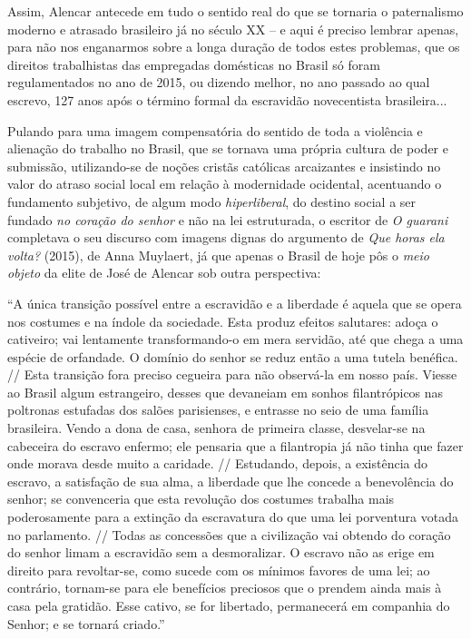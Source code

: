 Assim, Alencar antecede em tudo o sentido real do que se tornaria o
paternalismo moderno e atrasado brasileiro já no século XX -- e aqui é
preciso lembrar apenas, para não nos enganarmos sobre a longa duração de
todos estes problemas, que os direitos trabalhistas das empregadas
domésticas no Brasil só foram regulamentados no ano de 2015, ou dizendo
melhor, no ano passado ao qual escrevo, 127 anos após o término formal
da escravidão novecentista brasileira...

Pulando para uma imagem compensatória do sentido de toda a violência e
alienação do trabalho no Brasil, que se tornava uma própria cultura de
poder e submissão, utilizando-se de noções cristãs católicas arcaizantes
e insistindo no valor do atraso social local em relação à modernidade
ocidental, acentuando o fundamento subjetivo, de algum modo
\emph{hiperliberal}, do destino social a ser fundado \emph{no coração do
senhor} e não na lei estruturada, o escritor de \emph{O guarani}
completava o seu discurso com imagens dignas do argumento de \emph{Que
horas ela volta?} (2015), de Anna Muylaert, já que apenas o Brasil de
hoje pôs o \emph{meio objeto} da elite de José de Alencar sob outra
perspectiva:

``A única transição possível entre a escravidão e a liberdade é aquela
que se opera nos costumes e na índole da sociedade. Esta produz efeitos
salutares: adoça o cativeiro; vai lentamente transformando-o em mera
servidão, até que chega a uma espécie de orfandade. O domínio do senhor
se reduz então a uma tutela benéfica. // Esta transição fora preciso
cegueira para não observá-la em nosso país. Viesse ao Brasil algum
estrangeiro, desses que devaneiam em sonhos filantrópicos nas poltronas
estufadas dos salões parisienses, e entrasse no seio de uma família
brasileira. Vendo a dona de casa, senhora de primeira classe,
desvelar-se na cabeceira do escravo enfermo; ele pensaria que a
filantropia já não tinha que fazer onde morava desde muito a caridade.
// Estudando, depois, a existência do escravo, a satisfação de sua alma,
a liberdade que lhe concede a benevolência do senhor; se convenceria que
esta revolução dos costumes trabalha mais poderosamente para a extinção
da escravatura do que uma lei porventura votada no parlamento. // Todas
as concessões que a civilização vai obtendo do coração do senhor limam a
escravidão sem a desmoralizar. O escravo não as erige em direito para
revoltar-se, como sucede com os mínimos favores de uma lei; ao
contrário, tornam-se para ele benefícios preciosos que o prendem ainda
mais à casa pela gratidão. Esse cativo, se for libertado, permanecerá em
companhia do Senhor; e se tornará criado.''

